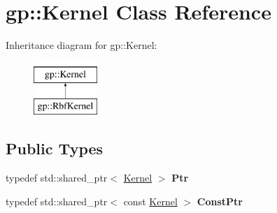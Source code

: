 \hypertarget{classgp_1_1_kernel}{}\section{gp\+:\+:Kernel Class Reference}
\label{classgp_1_1_kernel}
Inheritance diagram for gp\+:\+:Kernel\+:\begin{figure}[H]
\begin{center}
\leavevmode
\includegraphics[height=2.000000cm]{classgp_1_1_kernel}
\end{center}
\end{figure}
\subsection*{Public Types}
\begin{DoxyCompactItemize}
\item 
\hypertarget{classgp_1_1_kernel_a8029bbf70cbb1af8c54ef1fe5c180880}{}\label{classgp_1_1_kernel_a8029bbf70cbb1af8c54ef1fe5c180880} 
typedef std\+::shared\+\_\+ptr$<$ \hyperlink{classgp_1_1_kernel}{Kernel} $>$ {\bfseries Ptr}
\item 
\hypertarget{classgp_1_1_kernel_a6aad36652792684a96ee86b704697139}{}\label{classgp_1_1_kernel_a6aad36652792684a96ee86b704697139} 
typedef std\+::shared\+\_\+ptr$<$ const \hyperlink{classgp_1_1_kernel}{Kernel} $>$ {\bfseries Const\+Ptr}
\end{DoxyCompactItemize}
